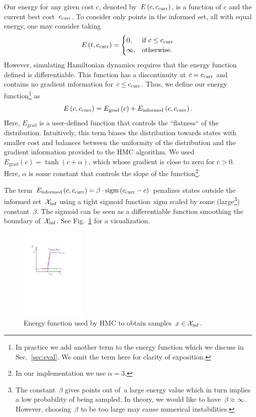 \documentclass[letterpaper, 10 pt, conference]{ieeeconf}  %
\begin{document}
Our energy for any given cost $c$, 
denoted by~$E\left(c,c_{\rm{curr}} \right)$, 
is a function of $c$ and the current best cost~$c_{\rm{curr}}$.
To consider only points in the informed set, all with equal energy, one may consider taking 
$$
E\left(t,c_{\rm{curr}} \right) = 
\begin{cases}
    0,	& \text{if } c \leq c_{\rm{curr}}\\        
    \infty,  	& \text{otherwise}.
\end{cases}
$$
However, simulating Hamiltonian dynamics requires that the energy function defined is differentiable.
This function has a discontinuity at $c = c_{\rm{curr}}$ 
and contains no gradient information for $c \leq c_{\rm{curr}}$.
Thus, we define our energy function\footnote{In practice we add another term to the energy function which we discuss in Sec.~\ref{sec:eval}. We omit the term here for clarity of exposition.} as  
\begin{equation}
\label{eq:energy}
E\left( c, c_{\rm{curr}} \right) 
= 
E_{\text{grad}} \left( c \right) + 
E_{\text{informed}} \left( c,c_{\rm{curr}} \right).
\end{equation}
Here, $E_{\text{grad}}$ is a user-defined function that
controls the ``flatness`` of the distribution.
Intuitively, this term biases the distribution towards states with smaller cost and balances between the uniformity of the distribution and the gradient information provided to the HMC algorithm.
We used $E_{\text{grad}} (c) = \tanh(c + \alpha )$,  which whose gradient is close to zero for $c>0$.
Here, $\alpha$ is some constant that controls the slope of the function\footnote{In our implementation we use $\alpha=3$.}.

The term 
$E_{\text{informed}} \left( c,c_{\rm{curr}} \right) 
= \beta \cdot \text{sigm}\left(c_{\rm{curr}} - c\right)
$
penalizes states outside the informed set~$\mathcal{X}_{\rm {inf}}$ using a tight sigmoid function~$\text{sigm}$ scaled by some (large\footnote{The constant~$\beta$ gives points out of~\Cinf a large energy value which in turn implies a low probability of being sampled. In theory, we would like to have~$\beta \approx \infty$. However, choosing~$\beta$ to be too large may cause numerical instabilities.}) constant~$\beta$.
The sigmoid can be seen as a differentiable function smoothing the boundary of~$\mathcal{X}_{\rm {inf}}$.
See Fig.~\ref{fig:energy} for a visualization.

\begin{figure}[tb]
  \centering
  	\includegraphics[height = 4.5cm ]{fig/energy.pdf}
  \caption{
    \captionstyle
  	Energy function used by HMC to obtain samples~$x \in \mathcal{X}_{\rm {inf}}$.
  	}
   	\label{fig:energy}
\end{figure}
\end{document}
